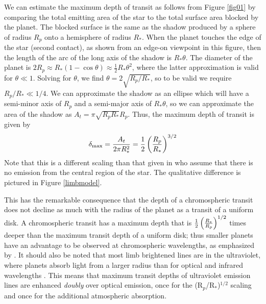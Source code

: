 \documentclass[manuscript]{aastex}
\newcommand{\oi}{\ensuremath{\mathrm{O}\,\scriptstyle \mathrm{I}}}
\newcommand{\p}{R$_p$/R$_*$}
\begin{document}
We can estimate the maximum depth of transit as follows from
Figure \ref{fig01} by comparing the total emitting area of the star to the total surface area blocked by the planet. The blocked surface is the same as the shadow produced by a sphere of radius $R_p$ onto a hemisphere of radius $R_*$. When the planet touches the edge of the star 
(second contact), as shown from an edge-on viewpoint in this figure,
then the length of the arc of the long axis of the shadow is
$R_*\theta$.  The diameter of the planet is 
$2 R_p \approx R_*(1-\cos{\theta}) \approx \frac{1}{2} R_* \theta^2$,
where the latter approximation is valid for $\theta \ll 1$.
Solving for $\theta$, we find $\theta = 2\sqrt{R_p/R_*}$, so to
be valid we require $R_p/R_* \ll 1/4$.  We can approximate
the shadow as an ellipse which will have a semi-minor axis of $R_p$
and a semi-major axis of $R_*\theta$, so we can approximate the
area of the shadow as $A_t = \pi \sqrt{R_pR_*} R_p$.  Thus,
the maximum depth of transit is given by 
\begin{equation} \label{depth_anal}
\delta_{\mathrm{max}} = {A_t \over 2 \pi R_*^2} = \frac{1}{2} \left({R_p \over R_*}\right)^{3/2}
\end{equation}
Note that this is a different scaling than that given in \citet{assef} who assume that there is no emission from the central region of the star. The qualitative difference is pictured in Figure \ref{limbmodel}.


This has the remarkable consequence that the depth of a chromospheric
transit does not decline as much with the radius of the planet as 
a transit of a uniform disk.  A chromospheric transit has a maximum
depth that is $\frac{1}{2} \left({R_* \over R_p}\right)^{1/2}$
times deeper than the maximum transit depth of a uniform disk;
thus smaller planets have an advantage to be observed at
chromospheric wavelengths, as emphasized by \citet{assef}. It should also be noted that most limb brightened lines are in the ultraviolet, where planets absorb light from a larger radius than for optical and infrared wavelengths \citep{vidmad}. This means that maximum transit depths of ultraviolet emission lines are enhanced {\it doubly} over optical emission, once for the (\p )$^{1/2}$ scaling and once for the additional atmospheric absorption.
\end{document}
